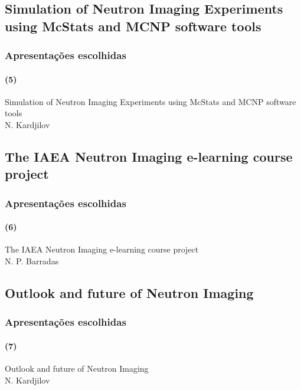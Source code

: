\documentclass[svgnames,smaller,table]{beamer}
\begin{document}
\subsection{Simulation of Neutron Imaging Experiments using McStats and MCNP software tools}
\begin{frame}
  \frametitle{Apresentações escolhidas}
  \framesubtitle{(5)}
  \begin{center}
    Simulation of Neutron Imaging Experiments using McStats and MCNP software tools\\
    \vspace{2.0cm}
    N. Kardjilov
  \end{center}
\end{frame}

\subsection{The IAEA Neutron Imaging e-learning course project}
\begin{frame}
  \frametitle{Apresentações escolhidas}
  \framesubtitle{(6)}
  \begin{center}
    The IAEA Neutron Imaging e-learning course project\\
    \vspace{2.0cm}
    N. P. Barradas
  \end{center}
\end{frame}


\subsection{Outlook and future of Neutron Imaging}
\begin{frame}
  \frametitle{Apresentações escolhidas}
  \framesubtitle{(7)}
  \begin{center}
    Outlook and future of Neutron Imaging\\
    \vspace{2.0cm}
    N. Kardjilov
  \end{center}
\end{frame}
\end{document}
